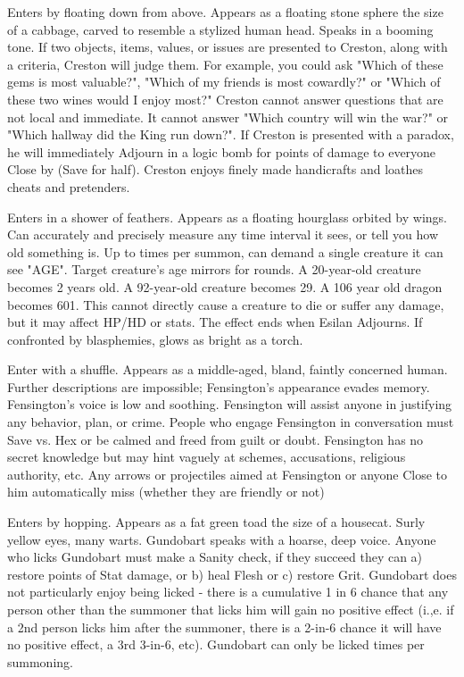 {
Enters by floating down from above. Appears as a floating stone sphere the size of a cabbage, carved to resemble a stylized human head. Speaks in a booming tone. If two objects, items, values, or issues are presented to Creston, along with a criteria, Creston will judge them. For example, you could ask "Which of these gems is most valuable?", "Which of my friends is most cowardly?" or "Which of these two wines would I enjoy most?" Creston cannot answer questions that are not local and immediate. It cannot answer "Which country will win the war?" or "Which hallway did the King run down?".  If Creston is presented with a paradox, he will immediately Adjourn in a logic bomb for \SUMDICE points of damage to everyone Close by (Save for half).  Creston enjoys finely made handicrafts and loathes cheats and pretenders. 


Enters in a shower of feathers. Appears as a floating hourglass orbited by wings. Can accurately and precisely measure any time interval it sees, or tell you how old something is.  Up to \DICE times per summon, can demand a single creature it can see "AGE". Target creature's age mirrors for \SUMDICE rounds. A 20-year-old creature becomes 2 years old. A 92-year-old creature becomes 29. A 106 year old dragon becomes 601. This cannot directly cause a creature to die or suffer any damage, but it may affect HP/HD or stats.  The effect ends when Esilan Adjourns. If confronted by blasphemies, glows as bright as a torch.



Enter with a shuffle. Appears as a middle-aged, bland, faintly concerned human. Further descriptions are impossible; Fensington's appearance evades memory. Fensington's voice is low and soothing. Fensington will assist anyone in justifying any behavior, plan, or crime. People who engage Fensington in conversation must Save vs. Hex or be calmed and freed from guilt or doubt. Fensington has no secret knowledge but may hint vaguely at schemes, accusations, religious authority, etc. Any arrows or projectiles aimed at Fensington or anyone Close to him automatically miss (whether they are friendly or not)


Enters by hopping. Appears as a fat green toad the size of a housecat. Surly yellow eyes, many warts. Gundobart speaks with a hoarse, deep voice. Anyone who licks Gundobart must make a Sanity check, if they succeed they can a) restore \DICE points of Stat damage, or b) heal \DICE Flesh  or c) restore \SUMDICE Grit.  Gundobart does not particularly enjoy being licked - there is a cumulative 1 in 6 chance that any person other than the summoner that licks him will gain no positive effect (i.,e.  if a 2nd person licks him after the summoner, there is a 2-in-6 chance it will have no positive effect, a 3rd 3-in-6, etc).  Gundobart can only be licked \DICE times per summoning.

}
